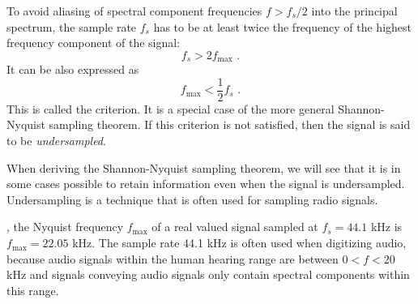 To avoid aliasing of spectral component frequencies $f>f_s/2$ into the principal spectrum, the sample rate $f_s$ has to be at 
least twice the frequency of the highest frequency component of the signal:
\begin{equation}
  \boxed{
    f_s > 2f_{\mathrm{max}}
    }\,\,.
\end{equation}
It can be also expressed as 
\begin{equation}
  \boxed{
    f_{\mathrm{max}}<\frac{1}{2}f_s
    }\,\,.
\end{equation}
This is called the \emph{} criterion. It is a special case of the more general Shannon-Nyquist sampling theorem. 
If this criterion is not satisfied, then the signal is said to be \emph{undersampled}.

When deriving the Shannon-Nyquist sampling theorem, we will see that it is in some cases possible to retain information even when the signal is undersampled. Undersampling is a technique that is often used for sampling radio signals.

, the Nyquist frequency $f_{\mathrm{max}}$ of a real valued signal sampled at $f_s=44.1$ kHz is $f_{\mathrm{max}}=22.05$ kHz. The sample rate 44.1 kHz is often used when digitizing audio, because audio signals within the human hearing range are between $0<f<20$ kHz and signals conveying audio signals only contain spectral components within this range.

